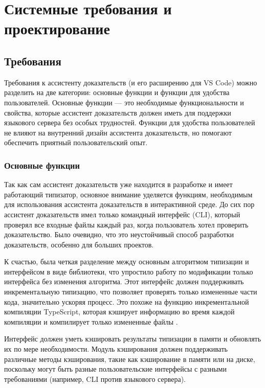 \chapter{Системные требования и проектирование}
\label{chap:req}

\section{Требования}

Требования к ассистенту доказательств (и его расширению для VS Code) можно разделить на две категории: основные функции и функции для удобства пользователей. Основные функции — это необходимые функциональности и свойства, которые ассистент доказательств должен иметь для поддержки языкового сервера без особых трудностей. Функции для удобства пользователей не влияют на внутренний дизайн ассистента доказательств, но помогают обеспечить приятный пользовательский опыт.

\subsection{Основные функции}

Так как сам ассистент доказательств \Rzk{} уже находится в разработке и имеет работающий типизатор, основное внимание уделяется функциям, необходимым для использования ассистента доказательств в интерактивной среде. До сих пор ассистент доказательств имел только командный интерфейс (CLI), который проверял все входные файлы каждый раз, когда пользователь хотел проверить доказательство. Было очевидно, что это неустойчивый способ разработки доказательств, особенно для больших проектов.

К счастью, была четкая разделение между основным алгоритмом типизации и интерфейсом в виде библиотеки, что упростило работу по модификации только интерфейса без изменения алгоритма. Этот интерфейс должен поддерживать инкрементальную типизацию, что позволяет проверять только измененные части кода, значительно ускоряя процесс. Это похоже на функцию инкрементальной компиляции TypeScript, которая кэширует информацию во время каждой компиляции и компилирует только измененные файлы \cite{Vanderkam2024}.

Интерфейс должен уметь кэшировать результаты типизации в памяти и обновлять их по мере необходимости. Модуль кэширования должен поддерживать различные методы кэширования, такие как кэширование в памяти или на диске, поскольку могут быть разные пользовательские интерфейсы с разными требованиями (например, CLI против языкового сервера).

